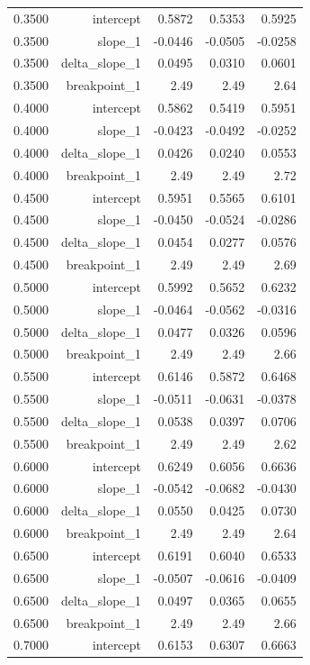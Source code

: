 \begin{longtable}{lrrrr}
  0.3500 & intercept & 0.5872 & 0.5353 & 0.5925 \\
  0.3500 & slope\_1 & -0.0446 & -0.0505 & -0.0258 \\
  0.3500 & delta\_slope\_1 & 0.0495 & 0.0310 & 0.0601 \\
  0.3500 & breakpoint\_1 & 2.49 & 2.49 & 2.64 \\
  0.4000 & intercept & 0.5862 & 0.5419 & 0.5951 \\
  0.4000 & slope\_1 & -0.0423 & -0.0492 & -0.0252 \\
  0.4000 & delta\_slope\_1 & 0.0426 & 0.0240 & 0.0553 \\
  0.4000 & breakpoint\_1 & 2.49 & 2.49 & 2.72 \\
  0.4500 & intercept & 0.5951 & 0.5565 & 0.6101 \\
  0.4500 & slope\_1 & -0.0450 & -0.0524 & -0.0286 \\
  0.4500 & delta\_slope\_1 & 0.0454 & 0.0277 & 0.0576 \\
  0.4500 & breakpoint\_1 & 2.49 & 2.49 & 2.69 \\
  0.5000 & intercept & 0.5992 & 0.5652 & 0.6232 \\
  0.5000 & slope\_1 & -0.0464 & -0.0562 & -0.0316 \\
  0.5000 & delta\_slope\_1 & 0.0477 & 0.0326 & 0.0596 \\
  0.5000 & breakpoint\_1 & 2.49 & 2.49 & 2.66 \\
  0.5500 & intercept & 0.6146 & 0.5872 & 0.6468 \\
  0.5500 & slope\_1 & -0.0511 & -0.0631 & -0.0378 \\
  0.5500 & delta\_slope\_1 & 0.0538 & 0.0397 & 0.0706 \\
  0.5500 & breakpoint\_1 & 2.49 & 2.49 & 2.62 \\
  0.6000 & intercept & 0.6249 & 0.6056 & 0.6636 \\
  0.6000 & slope\_1 & -0.0542 & -0.0682 & -0.0430 \\
  0.6000 & delta\_slope\_1 & 0.0550 & 0.0425 & 0.0730 \\
  0.6000 & breakpoint\_1 & 2.49 & 2.49 & 2.64 \\
  0.6500 & intercept & 0.6191 & 0.6040 & 0.6533 \\
  0.6500 & slope\_1 & -0.0507 & -0.0616 & -0.0409 \\
  0.6500 & delta\_slope\_1 & 0.0497 & 0.0365 & 0.0655 \\
  0.6500 & breakpoint\_1 & 2.49 & 2.49 & 2.66 \\
  0.7000 & intercept & 0.6153 & 0.6307 & 0.6663 \\

\end{longtable}
